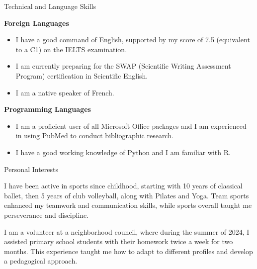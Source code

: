 \documentclass[
	10pt,
]{style} %
\begin{document}
\begin{rSection}{Technical and Language Skills}

	\textbf{Foreign Languages}
	\begin{itemize}[noitemsep, topsep=0pt, left=0pt]
		\item I have a good command of English, supported by my score of 7.5 (equivalent to a C1) on the IELTS examination.
		\item I am currently preparing for the SWAP (Scientific Writing Assessment Program) certification in Scientific English.
		\item I am a native speaker of French.
	\end{itemize}
	\textbf{Programming Languages}
	\begin{itemize}[noitemsep, topsep=0pt, left=0pt]
		\item I am a proficient user of all Microsoft Office packages and I am experienced in using PubMed to conduct bibliographic research.
		\item I have a good working knowledge of Python and I am familiar with R.
	\end{itemize}

\end{rSection}



\begin{rSection}{Personal Interests}
	\vspace{-1em}
	\begin{rSubsection}{}{}{}{}
		\item I have been active in sports since childhood, starting with 10 years of classical ballet, then 5 years of club volleyball, along with Pilates and Yoga. Team sports enhanced my teamwork and communication skills, while sports overall taught me perseverance and discipline.
		\item I am a volunteer at a neighborhood council, where during the summer of 2024, I assisted primary school students with their homework twice a week for two months. This experience taught me how to adapt to different profiles and develop a pedagogical approach.
	\end{rSubsection}

\end{rSection}


\end{document}
